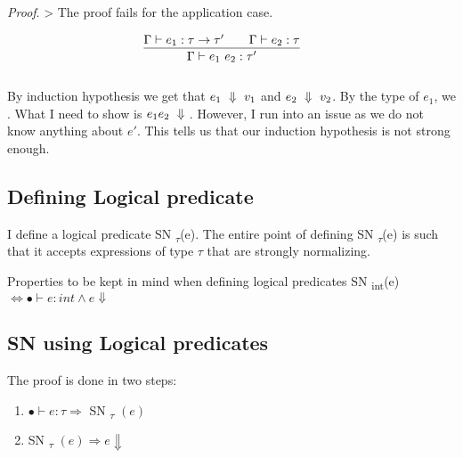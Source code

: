\documentclass[10pt]{article}
\begin{document}
\textit{Proof}. > The proof fails for the application case.

  
   \[
  \begin{array}{cc}
  
  
  \infr
  {\envent{e_1}{\funct{\tau}{\tau'}} \iand 
  	\envent{e_2}{\tau}}
  {\envent{e_1~e_2}{\tau'}} 
 
  &
  
  \\\\
  \end{array}
  \]
  By induction hypothesis we get that ${e_1 ~\Downarrow~ v_1}$ and ${e_2 ~\Downarrow~ v_2}$. By the type of $e_1$, we
  . What I need to show is $e_1 e_2 ~\Downarrow~$.
  \vskip 0.1in
  However, I  run into an issue as we do not know anything about $e'$. This tells us that our induction hypothesis is not strong enough. 
  
  \subsection{Defining Logical predicate}
  
 I define a logical predicate SN \textsubscript{$\tau$}(e). The entire point of defining  SN \textsubscript{$\tau$}(e) is such that it accepts expressions of type $\tau$ that are strongly normalizing. 
 
 \vskip 0.2in
 
 Properties to be kept in mind when defining logical predicates
  \vskip 0.2in
 SN \textsubscript{int}(e) $\Longleftrightarrow  \bullet \vdash e: int \wedge e \Downarrow $ 
\subsection{SN using Logical predicates}
  
  The proof is done in two steps:
  \vskip 0.2in
  \begin{enumerate}
  	\item  $ \bullet \vdash e: \tau \Longrightarrow$ SN  \textsubscript{$\tau$} $(e)$
  	\item  SN  \textsubscript{$\tau$} $(e) \Longrightarrow e \Downarrow$
  \end{enumerate}
\end{document}
